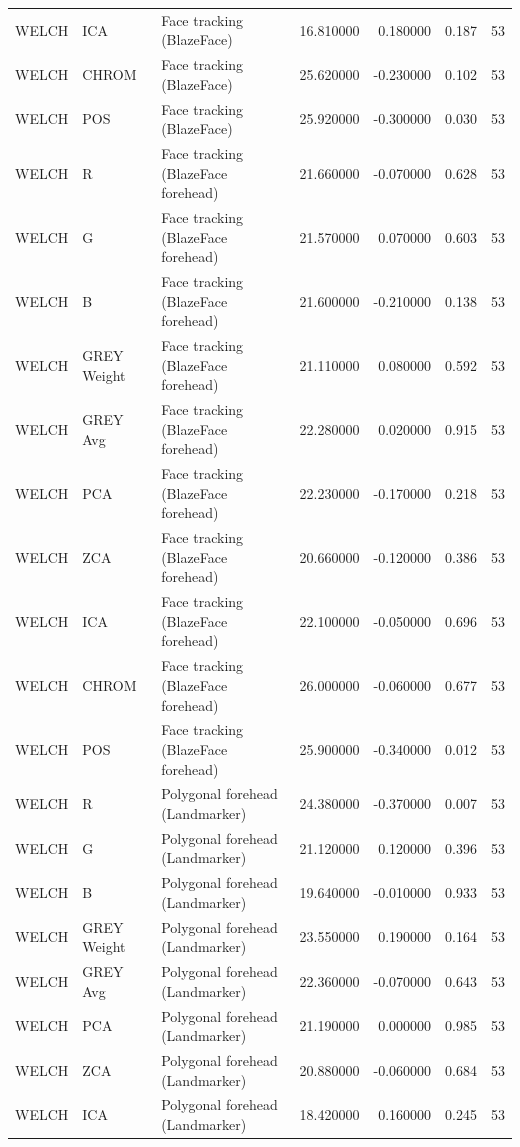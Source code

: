 \begin{table}[htbp]
\begin{tabular}{l l l r r l r}
WELCH & ICA & Face tracking (BlazeFace) & 16.810000 & 0.180000 & 0.187 & 53 \\
WELCH & CHROM & Face tracking (BlazeFace) & 25.620000 & -0.230000 & 0.102 & 53 \\
WELCH & POS & Face tracking (BlazeFace) & 25.920000 & -0.300000 & 0.030 & 53 \\
WELCH & R & Face tracking (BlazeFace forehead) & 21.660000 & -0.070000 & 0.628 & 53 \\
WELCH & G & Face tracking (BlazeFace forehead) & 21.570000 & 0.070000 & 0.603 & 53 \\
WELCH & B & Face tracking (BlazeFace forehead) & 21.600000 & -0.210000 & 0.138 & 53 \\
WELCH & GREY Weight & Face tracking (BlazeFace forehead) & 21.110000 & 0.080000 & 0.592 & 53 \\
WELCH & GREY Avg & Face tracking (BlazeFace forehead) & 22.280000 & 0.020000 & 0.915 & 53 \\
WELCH & PCA & Face tracking (BlazeFace forehead) & 22.230000 & -0.170000 & 0.218 & 53 \\
WELCH & ZCA & Face tracking (BlazeFace forehead) & 20.660000 & -0.120000 & 0.386 & 53 \\
WELCH & ICA & Face tracking (BlazeFace forehead) & 22.100000 & -0.050000 & 0.696 & 53 \\
WELCH & CHROM & Face tracking (BlazeFace forehead) & 26.000000 & -0.060000 & 0.677 & 53 \\
WELCH & POS & Face tracking (BlazeFace forehead) & 25.900000 & -0.340000 & 0.012 & 53 \\
WELCH & R & Polygonal forehead (Landmarker) & 24.380000 & -0.370000 & 0.007 & 53 \\
WELCH & G & Polygonal forehead (Landmarker) & 21.120000 & 0.120000 & 0.396 & 53 \\
WELCH & B & Polygonal forehead (Landmarker) & 19.640000 & -0.010000 & 0.933 & 53 \\
WELCH & GREY Weight & Polygonal forehead (Landmarker) & 23.550000 & 0.190000 & 0.164 & 53 \\
WELCH & GREY Avg & Polygonal forehead (Landmarker) & 22.360000 & -0.070000 & 0.643 & 53 \\
WELCH & PCA & Polygonal forehead (Landmarker) & 21.190000 & 0.000000 & 0.985 & 53 \\
WELCH & ZCA & Polygonal forehead (Landmarker) & 20.880000 & -0.060000 & 0.684 & 53 \\
WELCH & ICA & Polygonal forehead (Landmarker) & 18.420000 & 0.160000 & 0.245 & 53 \\

\end{tabular}
\end{table}
